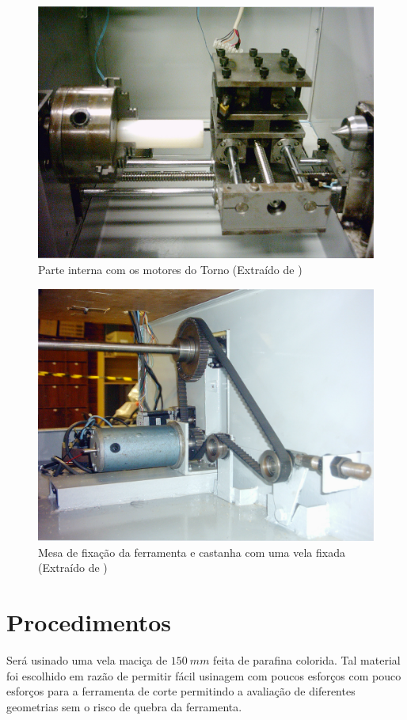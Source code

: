 \documentclass[a4paper,11pt]{article}
\begin{document}
\begin{figure}[H]
    \centering
    \includegraphics[width = 0.6\linewidth]{img/relat1/tornocnc2}
    \caption{Parte interna com os motores do Torno (Extraído de \cite{correia_2006})}
    \label{fig:tornoCNC-motores}
\end{figure}

\begin{figure}[H]
    \centering
    \includegraphics[width = 0.6\linewidth]{img/relat1/tornocnc3}
    \caption{Mesa de fixação da ferramenta e castanha com uma vela fixada (Extraído de \cite{correia_2006})}
    \label{fig:tornoCNC-mesa}
\end{figure}


\section{Procedimentos}
 Será usinado uma vela maciça de $150\ mm$ feita de parafina colorida. Tal material foi escolhido em razão de permitir fácil usinagem com poucos esforços com pouco esforços para a ferramenta de corte permitindo a avaliação de diferentes geometrias sem o risco de quebra da ferramenta. 
\end{document}
